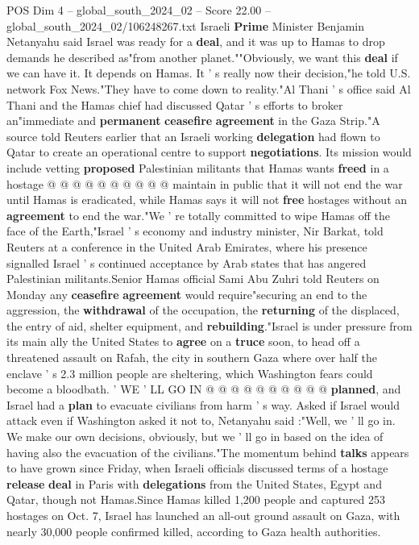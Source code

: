 \begin{textsample}{POS Dim 4 – global\_south\_2024\_02 – Score 22.00 – global\_south\_2024\_02/106248267.txt}
Israeli \textbf{Prime} Minister Benjamin Netanyahu said Israel was ready for a \textbf{deal}, and it was up to Hamas to drop demands he described as"from another planet.""Obviously, we want this \textbf{deal} if we can have it.
It depends on Hamas.
It ' s really now their decision,"he told U.S. network Fox News."They have to come down to reality."Al Thani ' s office said Al Thani and the Hamas chief had discussed Qatar ' s efforts to broker an"immediate and \textbf{permanent} \textbf{ceasefire} \textbf{agreement} in the Gaza Strip."A source told Reuters earlier that an Israeli working \textbf{delegation} had flown to Qatar to create an operational centre to support \textbf{negotiations}.
Its mission would include vetting \textbf{proposed} Palestinian militants that Hamas wants \textbf{freed} in a hostage @ @ @ @ @ @ @ @ @ @ maintain in public that it will not end the war until Hamas is eradicated, while Hamas says it will not \textbf{free} hostages without an \textbf{agreement} to end the war."We ' re totally committed to wipe Hamas off the face of the Earth,"Israel ' s economy and industry minister, Nir Barkat, told Reuters at a conference in the United Arab Emirates, where his presence signalled Israel ' s continued acceptance by Arab states that has angered Palestinian militants.Senior Hamas official Sami Abu Zuhri told Reuters on Monday any \textbf{ceasefire} \textbf{agreement} would require"securing an end to the aggression, the \textbf{withdrawal} of the occupation, the \textbf{returning} of the displaced, the entry of aid, shelter equipment, and \textbf{rebuilding}."Israel is under pressure from its main ally the United States to \textbf{agree} on a \textbf{truce} soon, to head off a threatened assault on Rafah, the city in southern Gaza where over half the enclave ' s 2.3 million people are sheltering, which Washington fears could become a bloodbath. ' WE ' LL GO IN @ @ @ @ @ @ @ @ @ @ \textbf{planned}, and Israel had a \textbf{plan} to evacuate civilians from harm ' s way.
Asked if Israel would attack even if Washington asked it not to, Netanyahu said :"Well, we ' ll go in.
We make our own decisions, obviously, but we ' ll go in based on the idea of having also the evacuation of the civilians."The momentum behind \textbf{talks} appears to have grown since Friday, when Israeli officials discussed terms of a hostage \textbf{release} \textbf{deal} in Paris with \textbf{delegations} from the United States, Egypt and Qatar, though not Hamas.Since Hamas killed 1,200 people and captured 253 hostages on Oct. 7, Israel has launched an all-out ground assault on Gaza, with nearly 30,000 people confirmed killed, according to Gaza health authorities.

\end{textsample}

